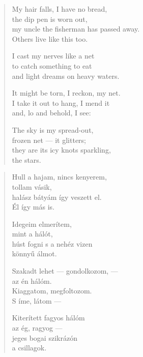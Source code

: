 \documentclass[11pt]{extbook}
\newcommand*{\centeredornament}{\centerline{\pgfornament[width=6cm]{88}}}
\begin{document}
\newpage


\vspace*{-15mm}
\centeredornament



\begin{verse}
  My hair falls, I have no bread, \\
  the dip pen is worn out, \\
  my uncle the fisherman has passed away. \\
  Others live like this too.

  I cast my nerves like a net \\
  to catch something to eat \\
  and light dreams on heavy waters.

  It might be torn, I reckon, my net. \\
  I take it out to hang, I mend it \\
  and, lo and behold, I see:

  The sky is my spread-out, \\
  frozen net --- it glitters; \\
  they are its icy knots sparkling, \\
  the stars.
\end{verse}

\newpage

\vspace*{-15mm}
\centeredornament



\begin{verse}
  Hull a hajam, nincs kenyerem, \\
  tollam vásik, \\
  halász bátyám így veszett el. \\
  Él így más is.

  Idegeim elmerítem, \\
  mint a hálót, \\
  húst fogni s a nehéz vizen \\
  könnyű álmot.

  Szakadt lehet --- gondolkozom, --- \\
  az én hálóm. \\
  Kiaggatom, megfoltozom. \\
  S íme, látom ---

  Kiterített fagyos hálóm \\
  az ég, ragyog --- \\
  jeges bogai szikrázón \\
  a csillagok.
\end{verse}
\end{document}
